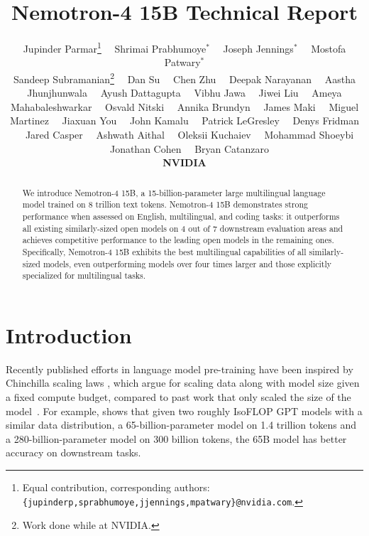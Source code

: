 \documentclass[11pt]{article}
\title{Nemotron-4 15B Technical Report}
\author{Jupinder Parmar\footnote{
Equal contribution, corresponding authors: {\tt 
\{jupinderp,sprabhumoye,jjennings,mpatwary\}@nvidia.com}. 
} \ \ Shrimai Prabhumoye$^{*}$ \ \ Joseph Jennings$^{*}$ \ \ Mostofa Patwary$^{*}$ \\ Sandeep Subramanian\footnote{Work done while at NVIDIA.} \ \ Dan Su \ \ Chen Zhu \ \ Deepak Narayanan \ \  Aastha Jhunjhunwala \ \  Ayush Dattagupta \ \ Vibhu Jawa \ \ Jiwei Liu \ \ Ameya Mahabaleshwarkar \ \ Osvald Nitski \ \  Annika Brundyn \ \ James Maki \ \ Miguel Martinez \ \ Jiaxuan You \ \ John Kamalu \ \ Patrick LeGresley \ \ Denys Fridman \ \ Jared Casper \ \  Ashwath Aithal \ \ Oleksii Kuchaiev \ \ Mohammad Shoeybi \ \ Jonathan Cohen \ \ Bryan Catanzaro \par \textbf{NVIDIA}}
\date{}
\newcommand{\ours}{Nemotron-4}
\begin{document}
\parindent 0.0in
\parskip 0.15in

\maketitle

\begin{abstract}
We introduce \ours{} 15B, a 15-billion-parameter large multilingual language model trained on 8 trillion text tokens. \ours{} 15B demonstrates strong performance when assessed on English, multilingual, and coding tasks: it outperforms all existing similarly-sized open models on 4 out of 7 downstream evaluation areas and achieves competitive performance to the leading open models in the remaining ones. Specifically, \ours{} 15B exhibits the best multilingual capabilities of all similarly-sized models, even outperforming models over four times larger and those explicitly specialized for multilingual tasks.




\end{abstract}


\section{Introduction}

Recently published efforts \citep{hoffmann2022training,touvron2023llama,touvron2023llama2,yang2023baichuan, jiang2023mistral} in language model pre-training have been inspired by Chinchilla scaling laws \citep{hoffmann2022training}, which argue for scaling data along with model size given a fixed compute budget, compared to past work that only scaled the size of the model~\citep{kaplan2020scaling,brown2020language, smith2022,rae2022scaling,workshop2023bloom}.
For example, \citep{hoffmann2022training} shows that given two roughly IsoFLOP GPT models with a similar data distribution, a 65-billion-parameter model on 1.4 trillion tokens and a 280-billion-parameter model on 300 billion tokens, the 65B model has better accuracy on downstream tasks. 
\end{document}

